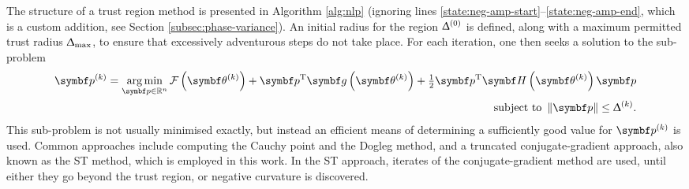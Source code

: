 The structure of a trust region method is presented in Algorithm
\ref{alg:nlp} (ignoring lines
\ref{state:neg-amp-start}--\ref{state:neg-amp-end}, which is a custom addition,
see Section \ref{subsec:phase-variance}). An initial radius for the region
$\Updelta^{(0)}$ is defined, along with a maximum permitted trust radius
$\Updelta_{\text{max}}$, to ensure that excessively adventurous steps do not take place.
For each iteration, one then seeks a solution to the sub-problem
\begin{equation}
    \begin{split}
        \bpk = \argmin_{\bp \in \mathbb{R}^{n}}
            \Fthk +
            \bp\T \bdgthk +
            \tfrac{1}{2} \bp\T \bdHthk \bp \\
        \text{subject to } \left \lVert \bp \right \rVert \leq \trustradius{k}.
    \end{split}
\end{equation}
This sub-problem is not usually minimised exactly, but instead an efficient
means of determining a sufficiently good value for $\bpk$ is used.
Common approaches include computing the Cauchy point and the Dogleg
method\cite[Section 4.1]{Nocedal2006}, and a truncated conjugate-gradient
approach, also known as the \ac{ST} method\cite[Algorithm7.2]{Nocedal2006},
which is employed in this work. In the \ac{ST} approach, iterates of
the conjugate-gradient method are used, until either they go beyond the trust
region, or negative curvature is discovered. 


